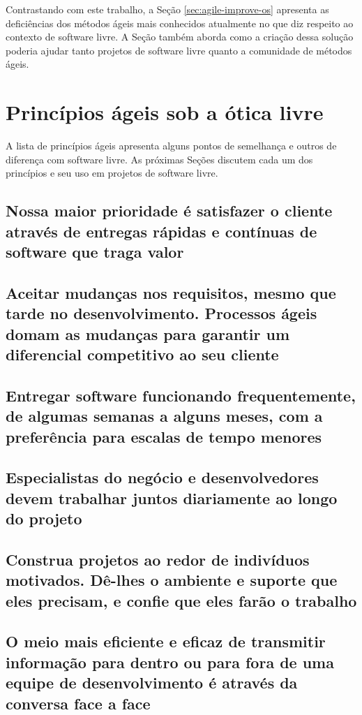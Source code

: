 Contrastando com este trabalho, a Seção \ref{sec:agile-improve-os}
apresenta as deficiências dos métodos ágeis mais conhecidos atualmente
no que diz respeito ao contexto de software livre. A Seção também
aborda como a criação dessa solução poderia ajudar tanto projetos de
software livre quanto a comunidade de métodos ágeis.

\section{Princípios ágeis sob a ótica livre}
\label{sec:principles}

A lista de princípios ágeis apresenta alguns pontos de semelhança e
outros de diferença com software livre. As próximas Seções discutem
cada um dos princípios e seu uso em projetos de software livre.

\subsection{Nossa maior prioridade é satisfazer o cliente através de
  entregas rápidas e contínuas de software que traga valor}

\subsection{Aceitar mudanças nos requisitos, mesmo que tarde no
  desenvolvimento. Processos ágeis domam as mudanças para garantir um
  diferencial competitivo ao seu cliente}

\subsection{Entregar software funcionando frequentemente, de algumas
  semanas a alguns meses, com a preferência para escalas de tempo
  menores}

\subsection{Especialistas do negócio e desenvolvedores devem trabalhar
  juntos diariamente ao longo do projeto}

\subsection{Construa projetos ao redor de indivíduos
  motivados. Dê-lhes o ambiente e suporte que eles precisam, e confie
  que eles farão o trabalho}

\subsection{O meio mais eficiente e eficaz de transmitir informação
  para dentro ou para fora de uma equipe de desenvolvimento é através
  da conversa face a face}

